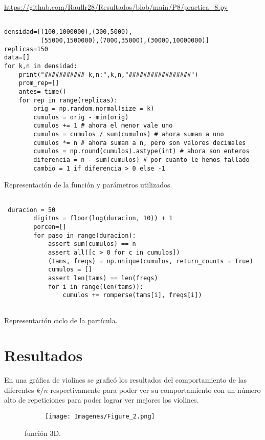 \documentclass{article}
\begin{document}
\url{https://github.com/Raullr28/Resultados/blob/main/P8/practica_8.py}

\renewcommand{\listingscaption}{Código}

\begin{listing}[H]
\begin{verbatim}

densidad=[(100,1000000),(300,5000),
          (55000,1500000),(7000,35000),(30000,10000000)]
replicas=150
data=[]
for k,n in densidad:
    print("########### k,n:",k,n,"#################")
    prom_rep=[]
    antes= time()
    for rep in range(replicas):
        orig = np.random.normal(size = k)
        cumulos = orig - min(orig)
        cumulos += 1 # ahora el menor vale uno
        cumulos = cumulos / sum(cumulos) # ahora suman a uno
        cumulos *= n # ahora suman a n, pero son valores decimales
        cumulos = np.round(cumulos).astype(int) # ahora son enteros
        diferencia = n - sum(cumulos) # por cuanto le hemos fallado
        cambio = 1 if diferencia > 0 else -1

  \end{verbatim}
  \label{lst:fibo}
  \caption{Representación de la función y parámetros utilizados.}
  
  
\end{listing}
\renewcommand{\listingscaption}{Código}
\begin{listing}[H]

\begin{verbatim}
 
 duracion = 50
        digitos = floor(log(duracion, 10)) + 1
        porcen=[]
        for paso in range(duracion):
            assert sum(cumulos) == n
            assert all([c > 0 for c in cumulos]) 
            (tams, freqs) = np.unique(cumulos, return_counts = True)
            cumulos = []
            assert len(tams) == len(freqs)
            for i in range(len(tams)):
                cumulos += romperse(tams[i], freqs[i]) 
 
  \end{verbatim}
  \label{lst:fibo}
  \caption{Representación ciclo de la partícula.}
\end{listing}
\newpage
\section{Resultados}
En una gráfica de violines se graficó los resultados del comportamiento de las diferentes $k$/$n$ respectivamente para poder ver su comportamiento con un número alto de repeticiones para poder lograr ver mejores los violines.
\begin{figure}[H]
\centering
\begin{subfigure}[b]{1.0\linewidth}
\texttt{[image: Imagenes/Figure\_2.png]}
\end{subfigure}
\caption{función 3D.}
\label{fig:westminster}
\end{figure}
\end{document}
